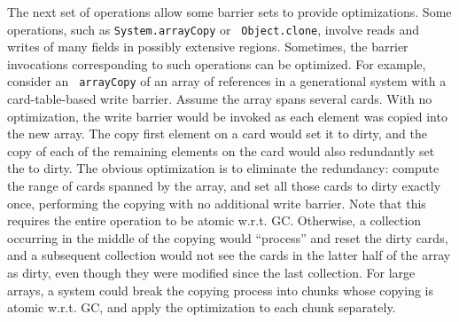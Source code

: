 \documentclass{article}
\begin{document}
The next set of operations allow some barrier sets to provide
optimizations.  Some operations, such as {\tt System.arrayCopy} or {\tt
Object.clone}, involve reads and writes of many fields in possibly
extensive regions.  Sometimes, the barrier invocations corresponding
to such operations can be optimized.  For example, consider an {\tt
arrayCopy} of an array of references in a generational system with a
card-table-based write barrier.  Assume the array spans several
cards.  With no optimization, the write barrier would be invoked as
each element was copied into the new array.  The copy first element on a
card would set it to dirty, and the copy of each of the remaining
elements on the card would also redundantly set the to dirty.  The
obvious optimization is to eliminate the redundancy: compute the range
of cards spanned by the array, and set all those cards to dirty
exactly once, performing the copying with no additional write
barrier.  Note that this requires the entire operation to
be atomic w.r.t. GC.  Otherwise, a collection occurring in the middle
of the copying would ``process'' and reset the dirty cards, and a
subsequent collection would not see the cards in the latter
half of the array as dirty, even though they were modified since the
last collection.  For large arrays, a system could break the
copying process into chunks whose copying is atomic w.r.t. GC, and
apply the optimization to each chunk separately.
\end{document}
